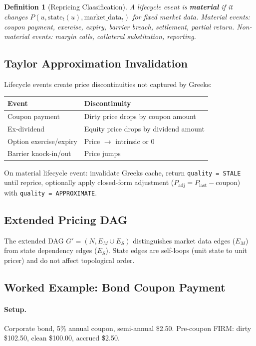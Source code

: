 \documentclass[11pt,a4paper]{article}
\newtheorem{definition}{Definition}[section]
\begin{document}
\begin{definition}[Repricing Classification]
\label{def:repricing-class}
A lifecycle event is \textbf{material} if it changes $P(u, \mathrm{state}_t(u), \mathrm{market\_data}_t)$ for fixed market data.  Material events: coupon payment, exercise, expiry, barrier breach, settlement, partial return.  Non-material events: margin calls, collateral substitution, reporting.
\end{definition}

\subsection{Taylor Approximation Invalidation}

Lifecycle events create price discontinuities not captured by Greeks:
\begin{center}
\small
\begin{tabular}{l l}
\toprule
\textbf{Event} & \textbf{Discontinuity} \\
\midrule
Coupon payment & Dirty price drops by coupon amount \\
Ex-dividend & Equity price drops by dividend amount \\
Option exercise/expiry & Price $\to$ intrinsic or 0 \\
Barrier knock-in/out & Price jumps \\
\bottomrule
\end{tabular}
\end{center}

On material lifecycle event: invalidate Greeks cache, return \texttt{quality = STALE} until reprice, optionally apply closed-form adjustment ($P_{\text{adj}} = P_{\text{last}} - \text{coupon}$) with \texttt{quality = APPROXIMATE}.

\subsection{Extended Pricing DAG}

The extended DAG $G' = (N, E_M \cup E_S)$ distinguishes market data edges ($E_M$) from state dependency edges ($E_S$).  State edges are self-loops (unit state to unit pricer) and do not affect topological order.

\subsection{Worked Example: Bond Coupon Payment}

\paragraph{Setup.}  Corporate bond, 5\% annual coupon, semi-annual \$2.50.  Pre-coupon FIRM: dirty \$102.50, clean \$100.00, accrued \$2.50.
\end{document}
